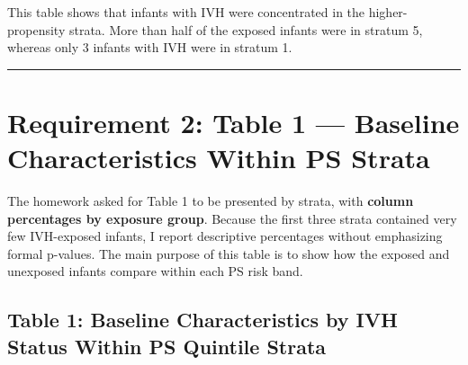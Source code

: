 \documentclass[
]{article}
\begin{document}
This table shows that infants with IVH were concentrated in the
higher-propensity strata. More than half of the exposed infants were in
stratum 5, whereas only 3 infants with IVH were in stratum 1.

\begin{center}\rule{0.5\linewidth}{0.5pt}\end{center}

\hypertarget{requirement-2-table-1-baseline-characteristics-within-ps-strata}{%
\section{Requirement 2: Table 1 --- Baseline Characteristics Within PS
Strata}\label{requirement-2-table-1-baseline-characteristics-within-ps-strata}}

The homework asked for Table 1 to be presented by strata, with
\textbf{column percentages by exposure group}. Because the first three
strata contained very few IVH-exposed infants, I report descriptive
percentages without emphasizing formal p-values. The main purpose of
this table is to show how the exposed and unexposed infants compare
within each PS risk band.

\hypertarget{table-1-baseline-characteristics-by-ivh-status-within-ps-quintile-strata}{%
\subsection{Table 1: Baseline Characteristics by IVH Status Within PS
Quintile
Strata}\label{table-1-baseline-characteristics-by-ivh-status-within-ps-quintile-strata}}
\end{document}

